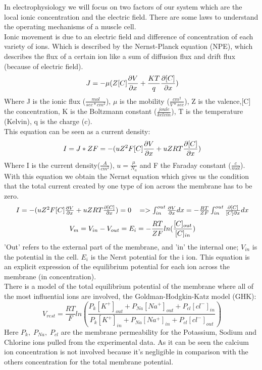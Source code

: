 \documentclass[a4paper,11pt]{report}
\begin{document}
In electrophysiology we will focus on two factors of our system which are the local ionic concentration and the electric field.
There are some laws to understand the operating mechanisms of a muscle cell.\\
Ionic movement is due to an electric field and difference of concentration of each variety of ions. Which is described by the Nernst-Planck equation (NPE), which describes the flux of a certain ion like a sum of diffusion flux and drift flux (because of electric field).\\
$$
	\ J=-\mu(Z[C]\frac{\partial{V}}{\partial{x}}+\frac{KT}{q}\frac{\partial{[C]}}{\partial{x}}) \\
$$
 Where J is the ionic flux ($ \frac{mol}{sec*cm^2} $),  $\mu$ is the mobility ($ \frac{cm^2}{V*sec}$), Z is the valence,[C] the concentration, K is the Boltzmann constant ($ \frac{joule}{kelvin}$), T is the temperature (Kelvin), q is the charge (c).\\
 This equation can be seen as a current density:\\
 $$
 \ I=J*ZF=-(uZ^2F[C]\frac{\partial{V}}{\partial{x}}+uZRT\frac{\partial{[C]}}{\partial{x}}) \\
 $$
 Where I is the current density($\frac{A}{cm^2}$),  $u=\frac{\mu}{N_{a}}$ and F the Faraday constant ($\frac{c}{mol}$).\\
 With this equation we obtain the Nernst equation which gives us the condition that the total current created by one type of ion across the membrane has to be zero.\\
 $$
 \begin{array}{l r}
 \ I=-(uZ^2F[C]\frac{\partial{V}}{\partial{x}}+uZRT\frac{\partial{[C]}}{\partial{x}})=0 \,   & => \int_{in}^{out} \frac{\partial{V}}{\partial{x}}dx=- \frac{RT}{ZF} \int_{in}^{out} \frac{\partial{[C]}}{[C]\partial{x}}dx
 \end{array} \\
 \\
 $$
 $$
 \ V_{m}=V_{in}-V_{out}=E_{i}=-\frac{RT}{ZF}ln(\frac{[C]_{out}}{[C]_{in}}) \\
 $$
 'Out' refers to the external part of the membrane, and 'in' the internal one; $V_{in}$ is the potential in the cell. $E_{i}$ is the Nerst potential for the i ion.
 This equation is an explicit expression of the equilibrium potential for each ion across the membrane (in concentration).\\
 There is a model of the total equilibrium potential of the membrane where all of the most influential ions are involved, the Goldman-Hodgkin-Katz model (GHK):
$$
\ V_{rest}= \frac{RT}{F}ln(\frac{P_{k}[K^{+}]_{out}+P_{Na}[Na^{+}]_{out}+P_{cl}[cl^{-}]_{in}}{P_{k}[K^{+}]_{in}+P_{Na}[Na^{+}]_{in}+P_{cl}[cl^{-}]_{out}})
$$
 Here $P_{k}, \; P_{Na}, \; P_{cl}$ are the membrane permeability for the Potassium, Sodium and Chlorine ions pulled from the experimental data. As it can be seen the calcium ion concentration is not involved because it's negligible in comparison with the others concentration for the total membrane potential. \cite{Johnston1994}
 
\end{document}
